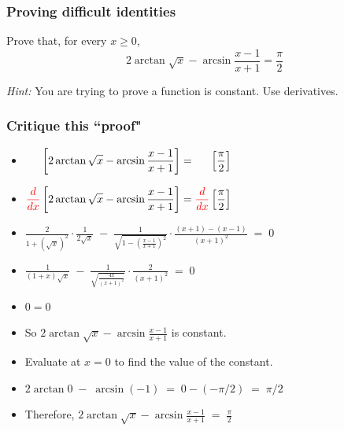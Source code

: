 \documentclass[14pt]{beamer}
\newcommand{\rojo}[1]{{\color{red} #1}}
\newcommand{\setsize}[1]{\fontsize{#1}{#1}\selectfont} %
\begin{document}
	\begin{frame}[t]
		\frametitle{Proving difficult identities}

		\begin{block}{}
			Prove that, for every $x \geq 0$,
			\[
				2 \arctan \sqrt{x}- \arcsin \frac{x-1}{x+1}= \frac{\pi}{2}
			\]
		\end{block}

		\emph{Hint:} You are trying to prove a function is constant. Use derivatives.
	\end{frame}
	\begin{frame}[t]
		\setsize{12}
		\frametitle{Critique this ``proof"}
		\begin{itemize}
			\item $\displaystyle  \phantom{\rojo{\frac{d}{dx}}} \left[ 2 \arctan
				\sqrt{x} - \arcsin \frac{x-1}{x+1} \right] =
				\phantom{\rojo{\frac{d}{dx}}} \left[ \frac{\pi}{2} \right] $

			\item $\displaystyle  \rojo{\frac{d}{dx}} \left[ 2 \arctan \sqrt{x} -
				\arcsin \frac{x-1}{x+1} \right] = \rojo{\frac{d}{dx}} \left[
				\frac{\pi}{2} \right] $

			\item $\displaystyle \frac{2}{1+ \left( \sqrt{x}\right)^{2}} \cdot \frac{1}{2\sqrt{x}}
				\; - \; \frac{1}{\sqrt{1- \left( \frac{x-1}{x+1}\right)^{2}}} \cdot \frac{(x+1)
				- (x-1)}{(x+1)^{2}} \; = \; 0$

			\item $\displaystyle \frac{1}{(1+ x)\sqrt{x} } \; - \; \frac{1}{ \sqrt{\frac{4x}{(x+1)^{2}}
				}} \cdot \frac{2}{(x+1)^{2}} \; = \; 0$

			\item $\displaystyle 0 = 0$

			\item So $\displaystyle  2 \arctan \sqrt{x} - \arcsin \frac{x-1}{x+1} $ is
				constant.

			\item Evaluate at $x=0$ to find the value of the constant.

			\item $\displaystyle 2 \arctan 0 \; - \; \arcsin (-1) \; = \; 0 - \left( -
				\pi/2 \right) \; = \; \pi/2 $

			\item Therefore, \;
				$\displaystyle 2 \arctan \sqrt{x} - \arcsin \frac{x-1}{x+1} \; = \; \frac{\pi}{2}$
		\end{itemize}
	\end{frame}
\end{document}
